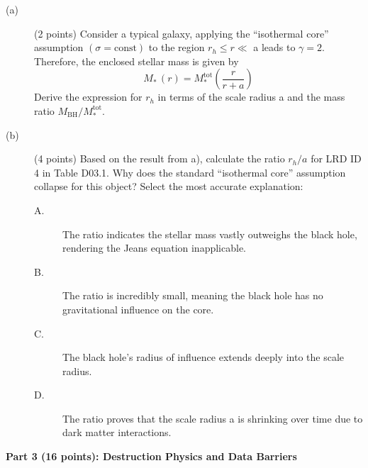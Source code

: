 \begin{description}
\item[(a)] (2 points) Consider a typical galaxy, applying the ``isothermal
  core'' assumption $(\sigma = \mathrm{const})$ to the region
  $r_h \le r \ll$ a leads to $\gamma = 2$. Therefore, the enclosed stellar mass
  is given by
  \[
  M_*\,(r) = M_*^{\mathrm{tot}} \left( \frac{r}{r+a} \right)
  \]
  Derive the expression for $r_h$ in terms of the scale radius a and the mass
  ratio $M_{\mathrm{BH}}/M_*^{\mathrm{tot}}$.
\item[(b)] (4 points) Based on the result from a), calculate the ratio $r_h/a$
  for LRD ID 4 in Table D03.1. Why does the standard ``isothermal core''
  assumption collapse for this object? Select the most accurate explanation:
  \begin{description}
  \item[A.] The ratio indicates the stellar mass vastly outweighs the black
    hole, rendering the Jeans equation inapplicable.
  \item[B.] The ratio is incredibly small, meaning the black hole has no
    gravitational influence on the core.
  \item[C.] The black hole's radius of influence extends deeply into the scale
    radius.
  \item[D.] The ratio proves that the scale radius a is shrinking over time due
    to dark matter interactions.
  \end{description}
\end{description}

\medskip\noindent\textbf{Part 3 (16 points): Destruction Physics and Data Barriers}

